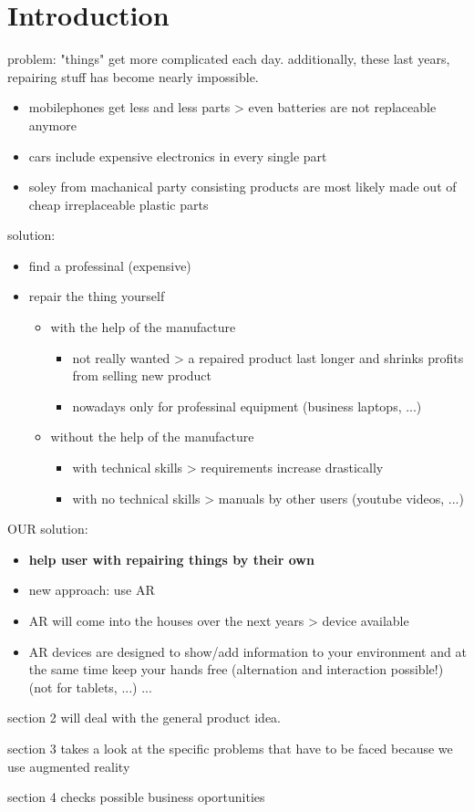 
\chapter{Introduction}
	
	problem: "things" get more complicated each day. additionally, these last years, repairing stuff has become nearly impossible.
	
	\begin{itemize}
		\itemsep0em
		\item mobilephones get less and less parts > even batteries are not replaceable anymore
		\item cars include expensive electronics in every single part
		\item soley from machanical party consisting products are most likely made out of cheap irreplaceable plastic parts
	\end{itemize}
	
	solution:
	\begin{itemize}
		\itemsep0em
		\item find a professinal (expensive)
		\item repair the thing yourself \begin{itemize}
			\itemsep0em
			\item with the help of the manufacture \begin{itemize}
				\item not really wanted > a repaired product last longer and shrinks profits from selling new product
				\item nowadays only for professinal equipment (business laptops, ...)
			\end{itemize}
			\item without the help of the manufacture \begin{itemize}
				\itemsep0em
				\item with technical skills > requirements increase drastically
				\item with no technical skills > manuals by other users (youtube videos, ...)
			\end{itemize}
		\end{itemize}
	\end{itemize}
	
	OUR solution:
	\begin{itemize}
		\itemsep0em
		\item \textbf{help user with repairing things by their own}
		\item new approach: use AR
		\item AR will come into the houses over the next years > device available
		\item AR devices are designed to show/add information to your environment and at the same time keep your hands free (alternation and interaction possible!) (not for tablets, ...) ...
	\end{itemize}
	
	
	section 2 will deal with the general product idea.
	
	section 3 takes a look at the specific problems that have to be faced because we use augmented reality
	
	section 4 checks possible business oportunities
